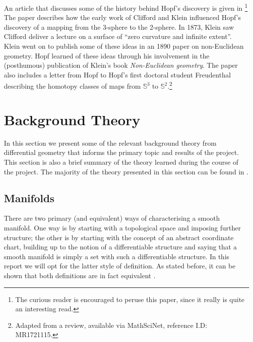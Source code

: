\documentclass[12pt,a4paper]{article}
\begin{document}
%
An article that discusses some of the history behind Hopf's discovery is given in \cite{MR1721115}\footnote{The curious reader is encouraged to peruse this paper, since it really is quite an interesting read.}
The paper describes how the early work of Clifford and Klein influenced Hopf's discovery of a mapping from the 3-sphere to the 2-sphere. In 1873, Klein saw Clifford deliver a lecture on a surface of ``zero curvature and infinite extent''. Klein went on to publish some of these ideas in an 1890 paper on non-Euclidean geometry. Hopf learned of these ideas through his involvement in the (posthumous) publication of Klein's book \textit{Non-Euclidean geometry}. The paper also includes a letter from Hopf to Hopf’s first doctoral student Freudenthal describing the homotopy classes of maps from $\mathbb{S}^3$ to $\mathbb{S}^2$.\footnote{Adapted from a review, available via MathSciNet, reference I.D: MR1721115.}
\pagebreak
\section{Background Theory}
In this section we present some of the relevant background theory from differential geometry that informs the primary topic and results of the project. This section is also a brief summary of the theory learned during the course of the project. The majority of the theory presented in this section can be found in \cite{andrews,burger2016riemannian,hitchin_2012,MR2954043}.
\subsection{Manifolds}
There are two primary (and equivalent) ways of characterising a smooth manifold. One way is by starting with a topological space and imposing further structure; the other is by starting with the concept of an abstract coordinate chart, building up to the notion of a differentiable structure and saying that a smooth manifold is simply a set with such a differentiable structure. In this report we will opt for the latter style of definition. As stated before, it can be shown that both definitions are in fact equivalent \cite{MR2954043,MR2766102}.\\
\end{document}
